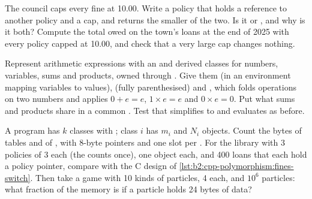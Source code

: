 \begin{exercise}[$\star\star$]\label{exo:b2:cpp-polymorphism:9}
The council caps every fine at 10.00. Write a policy  that holds a reference to another policy and
a cap, and returns the smaller of the two. Is it  or , and why is it both? Compute the total
owed on the town's loans at the end of 2025 with every policy capped at 10.00, and check that a very large cap
changes nothing.
\end{exercise}

\begin{exercise}[$\star\star\star$]\label{exo:b2:cpp-polymorphism:10}
Represent arithmetic expressions with an   and derived classes for numbers, variables,
sums and products, owned through . Give them  (in an environment mapping variables
to values),  (fully parenthesised) and , which folds operations on two numbers and applies
$0 + e = e$, $1 \times e = e$ and $0 \times e = 0$. Put what sums and products share in a common . Test
that  simplifies to  and evaluates as before.
\end{exercise}

\begin{exercise}[$\star\star\star$]\label{exo:b2:cpp-polymorphism:11}
A program has $k$ classes with ; class $i$ has $m_i$  and $N_i$ objects. Count the
bytes of tables and of , with 8-byte pointers and one slot per . For the library with
3 policies of 3  each (the  counts once), one object each, and 400 loans that each hold a
policy pointer, compare with the C design of \cref{lst:b2:cpp-polymorphism:fines-switch}. Then take a game with
10 kinds of particles, 4  each, and $10^6$ particles: what fraction of the memory is  if a particle holds 24 bytes of data?
\end{exercise}

